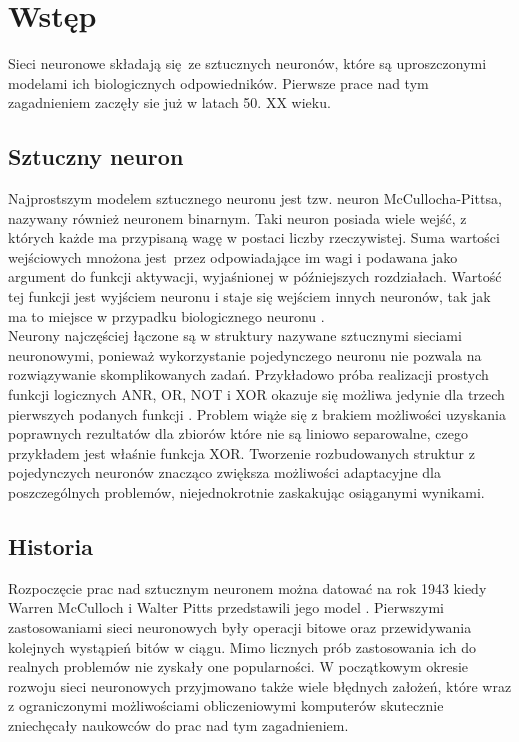 
\chapter{Wstęp}

Sieci neuronowe składają się ze sztucznych neuronów, które są uproszczonymi modelami ich
biologicznych odpowiedników. Pierwsze prace nad tym zagadnieniem zaczęły sie już w latach 50.
XX wieku.

\section{Sztuczny neuron}

Najprostszym modelem sztucznego neuronu jest tzw. neuron McCullocha-Pittsa, nazywany
również neuronem binarnym. Taki neuron posiada wiele wejść, z których każde ma przypisaną
wagę w postaci liczby rzeczywistej. Suma wartości wejściowych mnożona jest przez odpowiadające
im wagi i podawana jako argument do funkcji aktywacji, wyjaśnionej w późniejszych rozdziałach.
Wartość tej funkcji jest wyjściem neuronu i staje się wejściem innych neuronów,
tak jak ma to miejsce w przypadku biologicznego neuronu \cite{CS231n}.\\
Neurony najczęściej łączone są w struktury nazywane sztucznymi sieciami neuronowymi, ponieważ wykorzystanie
pojedynczego neuronu nie pozwala na rozwiązywanie skomplikowanych zadań.
Przykładowo próba realizacji prostych funkcji logicznych ANR, OR, NOT i XOR okazuje
się możliwa jedynie dla trzech pierwszych podanych funkcji \cite{XORproblem}.
Problem wiąże się z brakiem możliwości uzyskania poprawnych rezultatów dla zbiorów które
nie są liniowo separowalne, czego przykładem jest właśnie funkcja XOR. Tworzenie rozbudowanych
struktur z pojedynczych neuronów znacząco zwiększa możliwości adaptacyjne
dla poszczególnych problemów, niejednokrotnie zaskakując osiąganymi wynikami.

\section{Historia}

Rozpoczęcie prac nad sztucznym neuronem można datować na rok 1943 kiedy
Warren McCulloch i Walter Pitts przedstawili jego model \cite{NNbiology}.
Pierwszymi zastosowaniami sieci neuronowych były operacji bitowe oraz przewidywania kolejnych
wystąpień bitów w ciągu. Mimo licznych prób zastosowania ich do realnych problemów
nie zyskały one popularności. W początkowym okresie rozwoju sieci neuronowych
przyjmowano także wiele błędnych założeń, które wraz z ograniczonymi możliwościami
obliczeniowymi komputerów skutecznie zniechęcały naukowców do prac nad tym zagadnieniem.\\
